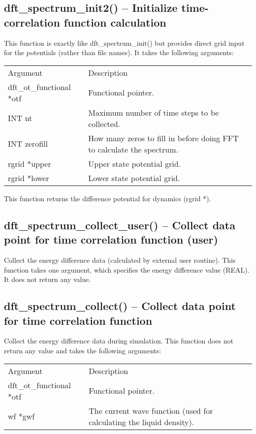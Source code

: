 \documentclass[12pt,letterpaper]{report}
\begin{document}
\subsection{dft\_spectrum\_init2() -- Initialize time-correlation function calculation}

This function is exactly like dft\_spectrum\_init() but provides direct grid input for the potentials (rather than file names). It takes the following arguments:
\begin{longtable}{p{} p{}}
Argument & Description\\
\cline{1-2}
dft\_ot\_functional *otf & Functional pointer.\\
INT nt & Maximum number of time steps to be collected.\\
INT zerofill & How many zeros to fill in before doing FFT to calculate the spectrum.\\
rgrid *upper & Upper state potential grid.\\
rgrid *lower & Lower state potential grid.\\
\end{longtable}
\noindent
This function returns the difference potential for dynamics (rgrid *).

\subsection{dft\_spectrum\_collect\_user() -- Collect data point for time correlation function (user)}

Collect the energy difference data (calculated by external user routine). This function takes one argument, which specifies the energy difference value (REAL). It does not return any value.

\subsection{dft\_spectrum\_collect() -- Collect data point for time correlation function}

Collect the energy difference data during simulation. This function does not return any value and takes the following arguments:
\begin{longtable}{p{} p{}}
Argument & Description\\
\cline{1-2}
dft\_ot\_functional *otf & Functional pointer.\\ 
wf *gwf & The current wave function (used for calculating the liquid density).\\
\end{longtable}
\end{document}
